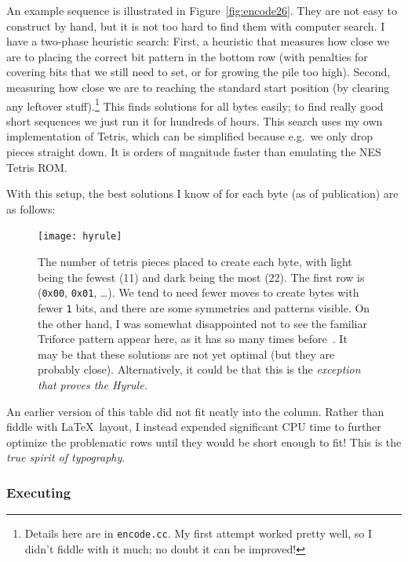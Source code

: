 \documentclass[twocolumn]{article}
\begin{document}
An example sequence is illustrated in Figure~\ref{fig:encode26}. They
are not easy to construct by hand, but it is not too hard to find them
with computer search. I have a two-phase heuristic search: First,
a heuristic that measures how close we are to placing the correct bit
pattern in the bottom row (with penalties for covering bits that we
still need to set, or for growing the pile too high). Second, measuring
how close we are to reaching the standard start position (by clearing
any leftover stuff).\!\footnote{Details here are in {\tt encode.cc}.
  My first attempt worked pretty well, so I didn't fiddle with it
  much; no doubt it can be improved!} This finds solutions for all
bytes easily; to find really good short sequences we just run it for
hundreds of hours. This search uses my own implementation of Tetris,
which can be simplified because e.g.~we only drop pieces straight down.
It is orders of magnitude faster than emulating the NES Tetris ROM.

With this setup, the best solutions I know of for each byte (as of
publication) are as follows:

\begin{figure}[ht]
  \centering
  \texttt{[image: hyrule]}
  \caption{
    The number of tetris pieces placed to create each byte, with
    light being the fewest (11) and dark being the most (22). The
    first row is ({\tt 0x00}, {\tt 0x01}, \ldots). We tend to need
    fewer moves to create bytes with fewer {\tt 1} bits, and there
    are some symmetries and patterns visible. On the other hand,
    I was somewhat disappointed not to see the familiar Triforce
    pattern appear here, as it has so many times before~\cite{murphy2014new,murphy2017zm,murphy2018making}. It may be that these solutions are not yet
    optimal (but they are probably close). Alternatively, 
    it could be that this is the {\em exception that proves
    the Hyrule.}
  } \label{fig:hyrule}
\end{figure}



An earlier version of this table did not fit neatly into the column.
Rather than fiddle with \LaTeX\ layout, I instead expended significant
CPU time to further optimize the problematic rows until they would
be short enough to fit! This is the {\em true spirit of typography}.

\subsubsection{Executing}
\end{document}
